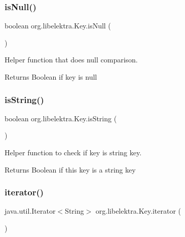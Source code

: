 \subsubsection{\texorpdfstring{is\+Null()}{isNull()}}
{\footnotesize\ttfamily boolean org.\+libelektra.\+Key.\+is\+Null (\begin{DoxyParamCaption}{ }\end{DoxyParamCaption})\hspace{0.3cm}{\ttfamily [inline]}}



Helper function that does null comparison. 

\begin{DoxyReturn}{Returns}
Boolean if key is null 
\end{DoxyReturn}
\mbox{\label{classorg_1_1libelektra_1_1Key_acb0e1141fa920b798a66a2076cd61562}} 
\subsubsection{\texorpdfstring{is\+String()}{isString()}}
{\footnotesize\ttfamily boolean org.\+libelektra.\+Key.\+is\+String (\begin{DoxyParamCaption}{ }\end{DoxyParamCaption})\hspace{0.3cm}{\ttfamily [inline]}}



Helper function to check if key is string key. 

\begin{DoxyReturn}{Returns}
Boolean if this key is a string key 
\end{DoxyReturn}
\mbox{\label{classorg_1_1libelektra_1_1Key_ad948a4ab2d5142b439830ddc5c16cc38}} 
\subsubsection{\texorpdfstring{iterator()}{iterator()}}
{\footnotesize\ttfamily java.\+util.\+Iterator$<$String$>$ org.\+libelektra.\+Key.\+iterator (\begin{DoxyParamCaption}{ }\end{DoxyParamCaption})\hspace{0.3cm}{\ttfamily [inline]}}



